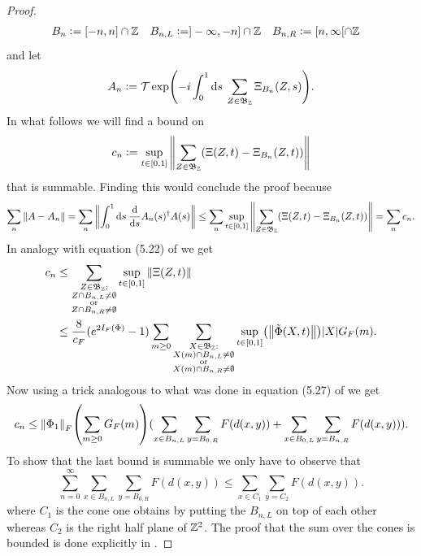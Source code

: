 \documentclass[11pt,a4paper,twoside]{article}
\numberwithin{equation}{section}
\begin{document}
\begin{proof}
\begin{align}
			B_n&\vcentcolon= [-n,n]\cap\mathbb Z&B_{n,L}&\vcentcolon= ]-\infty,-n]\cap\mathbb Z&B_{n,R}&\vcentcolon=[n,\infty[\cap\mathbb Z
		\end{align}
		and let
		\begin{equation}
			A_n\vcentcolon= \mathcal{T}\exp(-i\int_0^1 \text{d} s\: \sum_{Z\in\mathfrak{B}_{\mathbb Z}}\Xi_{B_n}(Z,s)).
		\end{equation}
		In what follows we will find a bound on
		\begin{equation}
			c_n\vcentcolon= \sup_{t\in[0,1]}\norm{\sum_{Z\in\mathfrak{B}_\mathbb Z}(\Xi(Z,t)-\Xi_{B_n}(Z,t))}
		\end{equation}
		that is summable. Finding this would conclude the proof because
		\begin{equation}
			\sum_n\norm{A-A_n}=\sum_n\norm{\int_0^1\text{d} s\: \frac{\text{d}}{\text{d} s}A_{n}(s)^\dagger A(s)}\leq \sum_n \sup_{t\in[0,1]}\norm{\sum_{Z\in\mathfrak{B}_\mathbb Z}(\Xi(Z,t)-\Xi_{B_n}(Z,t))}=\sum_n c_n.
		\end{equation}
		In analogy with equation (5.22) of \cite{ogata2021h3gmathbb} we get
		\begin{align}
			\label{eq:c_n_Bound1D}
			c_n&\leq \sum_{\substack{Z\in\mathfrak{B}_{\ZZ}:\\Z\cap B_{n,L}\neq\emptyset\\\text{or}\\Z\cap B_{n,R}\neq\emptyset}}\sup_{t\in[0,1]}\norm{\Xi(Z,t)}\\
			&\leq \frac{8}{c_F}(e^{2I_F(\Phi)}-1) \sum_{m\geq 0}\sum_{\substack{X\in\mathfrak{B}_{\ZZ}:\\X(m)\cap B_{n,L}\neq\emptyset\\\text{or}\\X(m)\cap B_{n,R}\neq\emptyset}}\sup_{t\in[0,1]}\left(\norm{\tilde{\Phi}(X,t)}\right)\abs{X}G_F(m).
		\end{align}
		Now using a trick analogous to what was done in equation (5.27) of \cite{ogata2021h3gmathbb} we get
		\begin{equation}
			c_n\leq \norm{\Phi_1}_F\left(\sum_{m\geq 0}G_F(m)\right)(\sum_{x\in B_{n,L}}\sum_{y=B_{0,R}}F(d(x,y))+\sum_{x\in B_{0,L}}\sum_{y=B_{n,R}}F(d(x,y))).
		\end{equation}
		To show that the last bound is summable we only have to observe that
		\begin{equation}
			\sum_{n=0}^\infty\sum_{x\in B_{n,L}}\sum_{y=B_{0,R}}F(d(x,y))\leq \sum_{x\in C_1}\sum_{y=C_2}F(d(x,y)).
		\end{equation}
		where $C_1$ is the cone one obtains by putting the $B_{n,L}$ on top of each other whereas $C_2$ is the right half plane of $\mathbb Z^2$. The proof that the sum over the cones is bounded is done explicitly in \cite{ogata2021h3gmathbb}.
	\end{proof}
\end{document}
